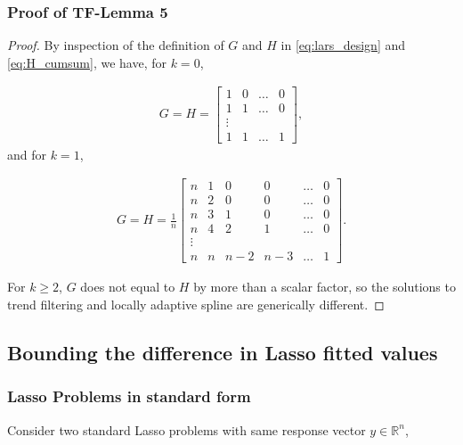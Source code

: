 \documentclass[a4paper]{article}
\newcommand{\RR}{\mathbb{R}}
\begin{document}
\subsubsection{Proof of TF-Lemma 5}
\begin{proof}
By inspection of the definition of $G$ and $H$ in \eqref{eq:lars_design} and \eqref{eq:H_cumsum}, we have, for $k = 0$,

\begin{align*}
G = H = 
\begin{bmatrix}
1 & 0 & \ldots & 0\\
1 & 1 & \ldots & 0\\
\vdots\\
1 & 1 & \ldots & 1
\end{bmatrix},
\end{align*}
and for $k = 1$,

\begin{align*}
G = H = \frac{1}{n}
\begin{bmatrix}
n & 1 & 0 & 0 & \ldots & 0\\
n & 2 & 0 & 0 & \ldots & 0\\
n & 3 & 1 & 0 & \ldots & 0\\
n & 4 & 2 & 1 & \ldots & 0\\
\vdots\\
n & n & n-2 & n-3 & \ldots & 1
\end{bmatrix}.
\end{align*}

For $k\geq 2$, $G$ does not equal to $H$ by more than a scalar factor, so the solutions to trend filtering and locally adaptive spline are generically different.
\end{proof}

\subsection{Bounding the difference in Lasso fitted values}
\subsubsection{Lasso Problems in standard form}

Consider two standard Lasso problems with same response vector $y\in\RR^n$,
\end{document}
